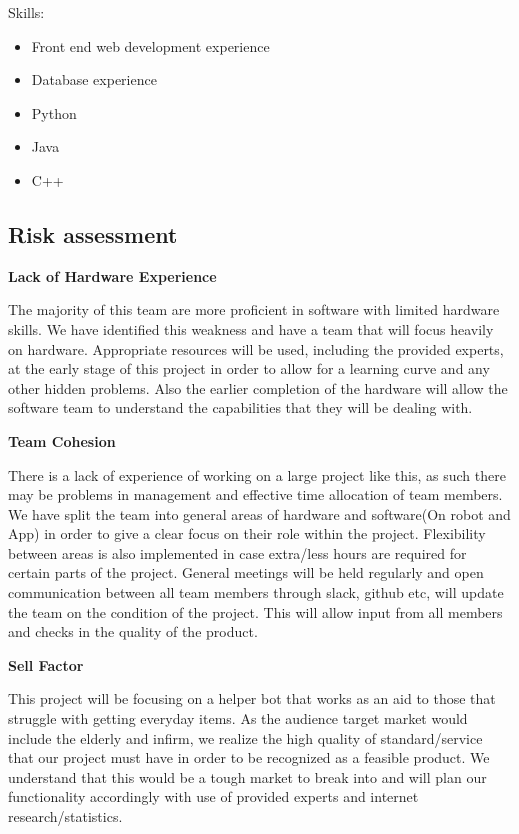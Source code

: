 \documentclass{article}
\begin{document}
Skills: 
\begin{itemize}
\item Front end web development experience
\item Database experience
\item Python
\item Java
\item C++
\end{itemize}
\subsection{Risk assessment} 

\textbf{Lack of Hardware Experience}

The majority of this team are more proficient in software with limited hardware skills. We have identified this weakness and have a team that will focus heavily on hardware. Appropriate resources will be used, including the provided experts, at the early stage of this project in order to allow for a learning curve and any other hidden problems. Also the earlier completion of the hardware will allow the software team to understand the capabilities that they will be dealing with.

\textbf{Team Cohesion}

There is a lack of experience of working on a large project like this, as such there may be problems in management and effective time allocation of team members. We have split the team into general areas of hardware and software(On robot and App) in order to give a clear focus on their role within the project. Flexibility between areas is also implemented in case extra/less hours are required for certain parts of the project. General meetings will be held regularly and open communication between all team members through slack, github etc, will update the team on the condition of the project. This will allow input from all members and checks in the quality of the product.

\textbf{Sell Factor}

This project will be focusing on a helper bot that works as an aid to those that struggle with getting everyday items. As the audience target market would include the elderly and infirm, we realize the high quality of standard/service that our project must have in order to be recognized as a feasible product. We understand that this would be a tough market to break into and will plan our functionality accordingly with use of provided experts and internet research/statistics.
\end{document}
